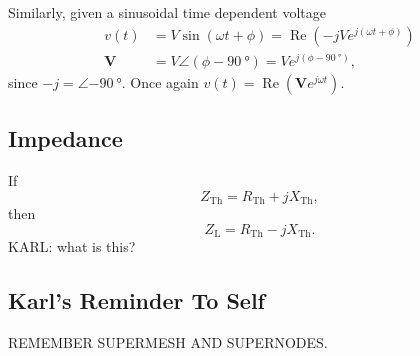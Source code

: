 \documentclass[letterpaper]{scrartcl}
\newcommand{\lr}[1]{\left(#1\right)}
\DeclareMathOperator{\Real}{Re}
\newcommand{\BV}[0]{\mathbf{V}}
\newcommand{\thev}[0]{{\mathrm{Th}}}
\begin{document}
Similarly, given a sinusoidal time dependent voltage
\begin{equation}\label{eqn:karlCircuitsCheatSheet:320}
\begin{aligned}
v(t) &= V \sin\lr{ \omega t + \phi } = \Real \lr{ -j V e^{j\lr{ \omega t + \phi } } } \\
\BV &= V \angle \lr{ \phi - \SI{90}{\degree}} = V e^{j \lr{ \phi - \SI{90}{\degree}} },
\end{aligned}
\end{equation}
since \( -j = \angle \SI{-90}{\degree} \).  Once again \( v(t) = \Real \lr{ \BV e^{j \omega t} } \).

\subsection*{Impedance}
If
\begin{equation}\label{eqn:karlCircuitsCheatSheet:340}
Z_\thev = R_\thev + j X_\thev,
\end{equation}
then
\begin{equation}\label{eqn:karlCircuitsCheatSheet:360}
Z_{\mathrm{L}} = R_\thev - j X_\thev.
\end{equation}
KARL: what is this?

\subsection*{Karl's Reminder To Self}

REMEMBER SUPERMESH AND SUPERNODES.
\end{document}
